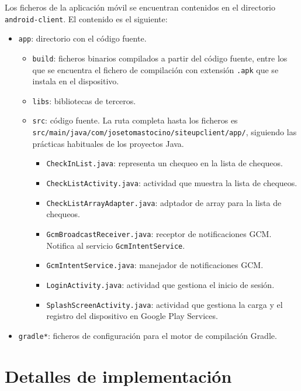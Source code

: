Los ficheros de la aplicación móvil se encuentran contenidos en el directorio
\texttt{android-client}. El contenido es el siguiente:

\begin{itemize}
\item \texttt{app}: directorio con el código fuente.
  \begin{itemize}
  \item \texttt{build}: ficheros binarios compilados a partir del código fuente,
    entre los que se encuentra el fichero de compilación con extensión
    \texttt{.apk} que se instala en el dispositivo.
  \item \texttt{libs}: bibliotecas de terceros.
  \item \texttt{src}: código fuente. La ruta completa hasta los ficheros es \\
    \texttt{src/main/java/com/josetomastocino/siteupclient/app/}, siguiendo las
    prácticas habituales de los proyectos Java.

    \begin{itemize}
    \item \texttt{CheckInList.java}: representa un chequeo en la lista de chequeos.
    \item \texttt{CheckListActivity.java}: actividad que muestra la lista de chequeos.
    \item \texttt{CheckListArrayAdapter.java}: adptador de array para la lista de chequeos.
    \item \texttt{GcmBroadcastReceiver.java}: receptor de notificaciones GCM. Notifica al servicio \texttt{GcmIntentService}.
    \item \texttt{GcmIntentService.java}: manejador de notificaciones GCM.
    \item \texttt{LoginActivity.java}: actividad que gestiona el inicio de sesión.
    \item \texttt{SplashScreenActivity.java}: actividad que gestiona la carga y
      el registro del dispositivo en Google Play Services.
    \end{itemize}
  \end{itemize}

\item \texttt{gradle*}: ficheros de configuración para el motor de compilación
  Gradle.
\end{itemize}

\section{Detalles de implementación}

